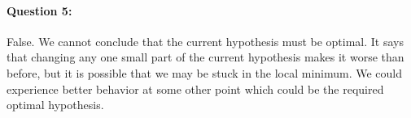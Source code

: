 \documentclass[letterpaper,11pt]{article}
\begin{document}
\paragraph{Question 5:} False. We cannot conclude that the current hypothesis must be optimal. It says that changing any one small part of the current hypothesis makes it worse than before, but it is possible that we may be stuck in the local minimum. We could experience better behavior at some other point which could be the required optimal hypothesis.
\end{document}
